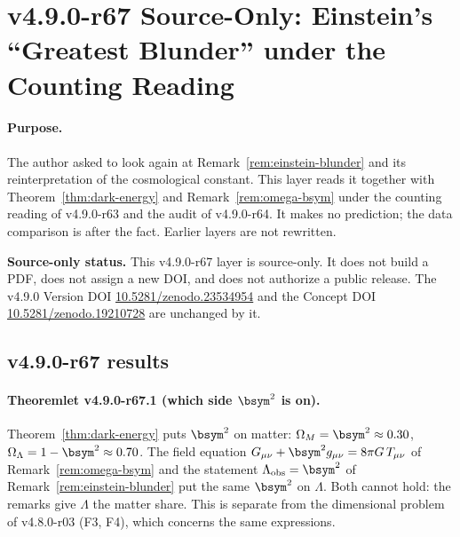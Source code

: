 \clearpage
\section*{v4.9.0-r67 Source-Only: Einstein's ``Greatest Blunder'' under the Counting Reading}
\label{sec:v490-r67-einstein-blunder}

\paragraph{Purpose.}
The author asked to look again at Remark~\ref{rem:einstein-blunder} and its reinterpretation of the cosmological constant.  This layer reads it together with
Theorem~\ref{thm:dark-energy} and Remark~\ref{rem:omega-bsym} under the counting reading of v4.9.0-r63 and the audit of v4.9.0-r64.  It makes no prediction; the
data comparison is after the fact.  Earlier layers are not rewritten.

\noindent\textbf{Source-only status.}
This v4.9.0-r67 layer is source-only.  It does not build a PDF, does not assign a new DOI,
and does not authorize a public release.  The v4.9.0 Version DOI
\href{https://doi.org/10.5281/zenodo.23534954}{10.5281/zenodo.23534954} and the Concept DOI
\href{https://doi.org/10.5281/zenodo.19210728}{10.5281/zenodo.19210728} are unchanged by it.

\subsection*{v4.9.0-r67 results}
\label{subsec:v490-r67-results}

\paragraph{Theoremlet v4.9.0-r67.1 (which side \texorpdfstring{$\bsym^2$}{beta squared} is on).}
Theorem~\ref{thm:dark-energy} puts \(\bsym^2\) on matter: \(\Omega_M=\bsym^2\approx0.30\), \(\Omega_\Lambda=1-\bsym^2\approx0.70\).  The field equation
\(G_{\mu\nu}+\bsym^2g_{\mu\nu}=8\pi G\,T_{\mu\nu}\) of Remark~\ref{rem:omega-bsym} and the statement \(\Lambda_{\mathrm{obs}}=\bsym^2\) of
Remark~\ref{rem:einstein-blunder} put the same \(\bsym^2\) on \(\Lambda\).  Both cannot hold: the remarks give \(\Lambda\) the matter share.  This is separate
from the dimensional problem of v4.8.0-r03 (F3, F4), which concerns the same expressions.

